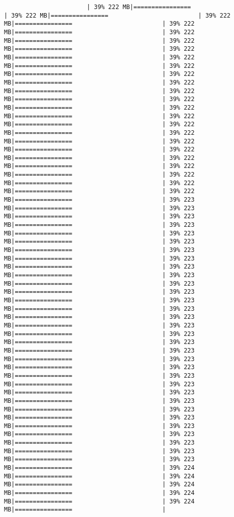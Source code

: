 \documentclass[
]{article}
\begin{document}
\begin{verbatim}
                       | 39% 222 MB|================                         | 39% 222 MB|================                         | 39% 222 MB|================                         | 39% 222 MB|================                         | 39% 222 MB|================                         | 39% 222 MB|================                         | 39% 222 MB|================                         | 39% 222 MB|================                         | 39% 222 MB|================                         | 39% 222 MB|================                         | 39% 222 MB|================                         | 39% 222 MB|================                         | 39% 222 MB|================                         | 39% 222 MB|================                         | 39% 222 MB|================                         | 39% 222 MB|================                         | 39% 222 MB|================                         | 39% 222 MB|================                         | 39% 222 MB|================                         | 39% 222 MB|================                         | 39% 222 MB|================                         | 39% 222 MB|================                         | 39% 222 MB|================                         | 39% 222 MB|================                         | 39% 223 MB|================                         | 39% 223 MB|================                         | 39% 223 MB|================                         | 39% 223 MB|================                         | 39% 223 MB|================                         | 39% 223 MB|================                         | 39% 223 MB|================                         | 39% 223 MB|================                         | 39% 223 MB|================                         | 39% 223 MB|================                         | 39% 223 MB|================                         | 39% 223 MB|================                         | 39% 223 MB|================                         | 39% 223 MB|================                         | 39% 223 MB|================                         | 39% 223 MB|================                         | 39% 223 MB|================                         | 39% 223 MB|================                         | 39% 223 MB|================                         | 39% 223 MB|================                         | 39% 223 MB|================                         | 39% 223 MB|================                         | 39% 223 MB|================                         | 39% 223 MB|================                         | 39% 223 MB|================                         | 39% 223 MB|================                         | 39% 223 MB|================                         | 39% 223 MB|================                         | 39% 223 MB|================                         | 39% 223 MB|================                         | 39% 223 MB|================                         | 39% 223 MB|================                         | 39% 224 MB|================                         | 39% 224 MB|================                         | 39% 224 MB|================                         | 39% 224 MB|================                         | 39% 224 MB|================                         | 
\end{verbatim}
\end{document}
